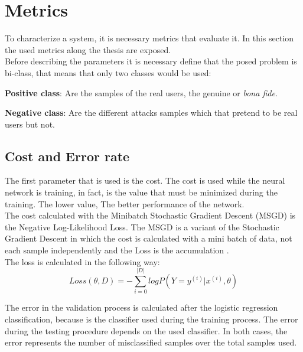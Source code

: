 \section{Metrics}
To characterize a system, it is necessary metrics that evaluate it. In this section the used metrics along the thesis are exposed.\\

Before describing the parameters it is necessary define that the posed problem is bi-class, that means that only two classes would be used:

\begin{description}
\item \textbf{Positive class}: Are the samples of the real users, the genuine or \textit{bona fide}.
\item \textbf{Negative class}: Are the different attacks samples which that pretend to be real users but not.
\end{description}

\subsection{Cost and Error rate}
The first parameter that is used is the cost. The cost is used while the neural network is training, in fact, is the value that must be minimized during the training. The lower value, The better performance of the network.\\

The cost calculated with the Minibatch Stochastic Gradient Descent (MSGD) is the Negative Log-Likelihood Loss. The MSGD is a variant of the Stochastic Gradient Descent in which the cost is calculated with a mini batch of data, not each sample independently and the Loss is the accumulation \cite{Stutz}.\\

The loss is calculated in the following way:\\

\begin{equation}
  Loss(\theta, D) = - \sum_{i=0}^{|D|}log P(Y = y^{(i)}|x^{(i)}, \theta)
\end{equation}

The error in the validation process is calculated after the logistic regression classification, because is the classifier used during the training process. The error during the testing procedure depends on the used classifier. In both cases, the error represents the number of misclassified samples over the total samples used.\\


